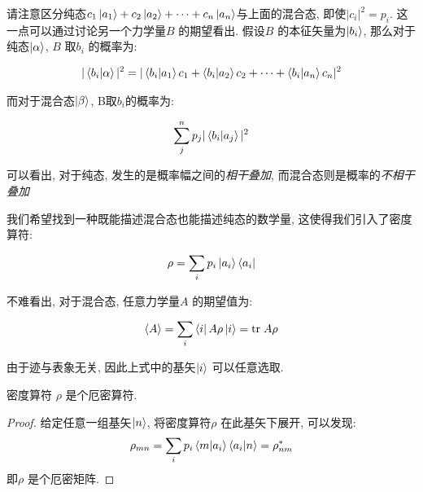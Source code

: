 \begin{remark}
  请注意区分纯态$c_1\ket{a_1} + c_2\ket{a_2}+\cdots+c_{n}\ket{a_{n}}$与上面的混合态,
  即使$|c_{i}|^{2} = p_{i}$. 这一点可以通过讨论另一个力学量$B$ 的期望看出.
  假设$B$ 的本征矢量为$\ket{b_i}$, 那么对于纯态$\ket{\alpha}$,  $B$ 取$b_{i}$ 的概率为:
  
  \begin{equation}
    \begin{aligned}
      |\bra{b_{i}}\ket{\alpha}|^{2} = |\bra{b_{i}}\ket{a_1}c_1 + \bra{b_{i}}\ket{a_2}c_2 + \cdots + \bra{b_{i}}\ket{a_{n}}c_{n}|^{2}
    \end{aligned}
  \end{equation}

  而对于混合态$\ket{\beta}$, B取$b_{i}$的概率为:

  \begin{equation}
    \begin{aligned}
      \sum_{j}^{n} p_{j} |\bra{b_{i}}\ket{a_{j}}|^{2}
    \end{aligned}
  \end{equation}

  可以看出, 对于纯态, 发生的是概率幅之间的\emph{相干叠加}, 而混合态则是概率的\emph{不相干叠加}
\end{remark}

我们希望找到一种既能描述混合态也能描述纯态的数学量, 这使得我们引入了密度算符:

\begin{equation}
  \begin{aligned}
    \rho = \sum_{i} p_{i} \ket{a_{i}}\bra{a_{i}}
  \end{aligned}
\end{equation}

不难看出, 对于混合态, 任意力学量$A$ 的期望值为:

\begin{equation}
  \begin{aligned}
    \langle A\rangle = \sum_{i} \bra{i}A \rho \ket{i} = {\rm tr} \;A \rho
  \end{aligned}
\end{equation}

由于迹与表象无关, 因此上式中的基矢$\ket{i}$ 可以任意选取.

\begin{theorem}
  密度算符 $\rho$ 是个厄密算符.
\end{theorem}
\begin{proof}
  给定任意一组基矢$\ket{n}$, 将密度算符$\rho$ 在此基矢下展开, 可以发现:
  \begin{equation}
    \begin{aligned}
      \rho_{mn} = \sum_{i}p_{i}\bra{m}\ket{a_{i}}\bra{a_{i}}\ket{n} = \rho_{nm}^{*}
    \end{aligned}
  \end{equation}
  即$\rho$ 是个厄密矩阵.
\end{proof}

